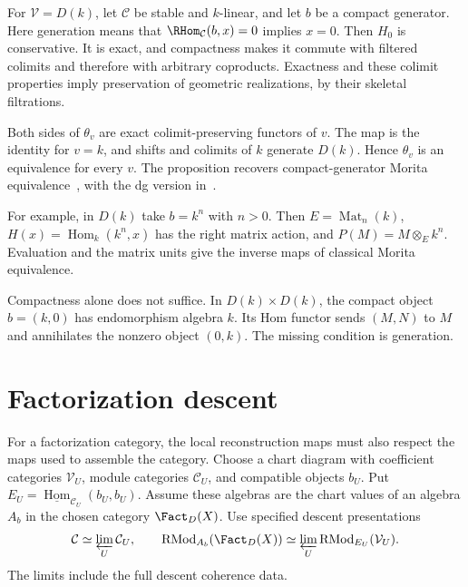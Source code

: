 For $\mathcal V=D(k)$, let $\mathcal C$ be stable and $k$-linear, and let $b$ be a compact generator.
Here generation means that $\RHom_{\mathcal C}(b,x)=0$ implies $x=0$.
Then $H_0$ is conservative.
It is exact, and compactness makes it commute with filtered colimits and therefore with arbitrary coproducts.
Exactness and these colimit properties imply preservation of geometric realizations, by their skeletal filtrations.

Both sides of $\theta_v$ are exact colimit-preserving functors of $v$.
The map is the identity for $v=k$, and shifts and colimits of $k$ generate $D(k)$.
Hence $\theta_v$ is an equivalence for every $v$.
The proposition recovers compact-generator Morita equivalence~\cite[Theorem~7.1.2.1]{LurieHA}, with the dg version in~\cite[Theorem~3.8(c)]{Keller2006DG}.

For example, in $D(k)$ take $b=k^n$ with $n>0$.
Then $E=\operatorname{Mat}_n(k)$, $H(x)=\operatorname{Hom}_k(k^n,x)$ has the right matrix action, and $P(M)=M\otimes_E k^n$.
Evaluation and the matrix units give the inverse maps of classical Morita equivalence.

Compactness alone does not suffice.
In $D(k)\times D(k)$, the compact object $b=(k,0)$ has endomorphism algebra $k$.
Its Hom functor sends $(M,N)$ to $M$ and annihilates the nonzero object $(0,k)$.
The missing condition is generation.

\section{Factorization descent}
For a factorization category, the local reconstruction maps must also respect the maps used to assemble the category.
Choose a chart diagram with coefficient categories $\mathcal V_U$, module categories $\mathcal C_U$, and compatible objects $b_U$.
Put $E_U=\underline{\operatorname{Hom}}_{\mathcal C_U}(b_U,b_U)$.
Assume these algebras are the chart values of an algebra $A_b$ in the chosen category $\Fact_D(X)$.
Use specified descent presentations
\[
 \mathcal C\simeq\varprojlim_U\mathcal C_U,
 \qquad
 \operatorname{RMod}_{A_b}(\Fact_D(X))
   \simeq\varprojlim_U\operatorname{RMod}_{E_U}(\mathcal V_U).
\]
The limits include the full descent coherence data.

